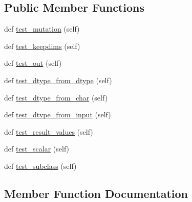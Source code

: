 \subsection*{Public Member Functions}
\begin{DoxyCompactItemize}
\item 
def \hyperlink{classnumpy_1_1lib_1_1tests_1_1test__nanfunctions_1_1SharedNanFunctionsTestsMixin_a92f5afae2581e7d8a5c58badfa01db32}{test\+\_\+mutation} (self)
\item 
def \hyperlink{classnumpy_1_1lib_1_1tests_1_1test__nanfunctions_1_1SharedNanFunctionsTestsMixin_a4447cce006ad5149ff2637ee288e24ab}{test\+\_\+keepdims} (self)
\item 
def \hyperlink{classnumpy_1_1lib_1_1tests_1_1test__nanfunctions_1_1SharedNanFunctionsTestsMixin_a1b2f0f095c888fcb4d8a0ad9c4d1975a}{test\+\_\+out} (self)
\item 
def \hyperlink{classnumpy_1_1lib_1_1tests_1_1test__nanfunctions_1_1SharedNanFunctionsTestsMixin_a9f8338c6330e772bffe900ae7b7cd1d4}{test\+\_\+dtype\+\_\+from\+\_\+dtype} (self)
\item 
def \hyperlink{classnumpy_1_1lib_1_1tests_1_1test__nanfunctions_1_1SharedNanFunctionsTestsMixin_a37b621d1a6b32629ae03b41fb80846ef}{test\+\_\+dtype\+\_\+from\+\_\+char} (self)
\item 
def \hyperlink{classnumpy_1_1lib_1_1tests_1_1test__nanfunctions_1_1SharedNanFunctionsTestsMixin_a7f24cf64e8faeecec43e43d77978c783}{test\+\_\+dtype\+\_\+from\+\_\+input} (self)
\item 
def \hyperlink{classnumpy_1_1lib_1_1tests_1_1test__nanfunctions_1_1SharedNanFunctionsTestsMixin_a6054d1deaf730f3ab27d7f058873830f}{test\+\_\+result\+\_\+values} (self)
\item 
def \hyperlink{classnumpy_1_1lib_1_1tests_1_1test__nanfunctions_1_1SharedNanFunctionsTestsMixin_a2dcd6560f1926aa1b9d861e6b3d4e639}{test\+\_\+scalar} (self)
\item 
def \hyperlink{classnumpy_1_1lib_1_1tests_1_1test__nanfunctions_1_1SharedNanFunctionsTestsMixin_a9da9f50e9e364b50a510f4d1f2cac676}{test\+\_\+subclass} (self)
\end{DoxyCompactItemize}


\subsection{Member Function Documentation}
\mbox{\label{classnumpy_1_1lib_1_1tests_1_1test__nanfunctions_1_1SharedNanFunctionsTestsMixin_a37b621d1a6b32629ae03b41fb80846ef}} 
